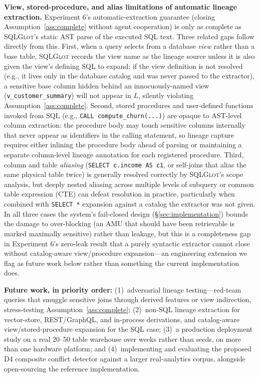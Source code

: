 \documentclass[nolineno]{ieeeaccess}
\begin{document}
\textbf{View, stored-procedure, and alias limitations of automatic lineage
extraction.} Experiment 6's automatic-extraction guarantee (closing
Assumption~\ref{ass:complete} without agent cooperation) is only as complete
as \textsc{SQLGlot}'s static AST parse of the executed SQL text. Three
related gaps follow directly from this. First, when a query selects from a
database \emph{view} rather than a base table, \textsc{SQLGlot} records the
view name as the lineage source unless it is also given the view's defining
SQL to expand; if the view definition is not resolved (e.g., it lives only
in the database catalog and was never passed to the extractor), a
sensitive base column hidden behind an innocuously-named view
(\texttt{v\_customer\_summary}) will not appear in $L$, silently violating
Assumption~\ref{ass:complete}. Second, stored procedures and
user-defined functions invoked from SQL (e.g., \texttt{CALL
compute\_churn(...)}) are opaque to AST-level column extraction: the
procedure body may touch sensitive columns internally that never appear as
identifiers in the calling statement, so lineage capture requires either
inlining the procedure body ahead of parsing or maintaining a separate
column-level lineage annotation for each registered procedure. Third,
column and table \emph{aliasing} (\texttt{SELECT c.income AS c1}, or
self-joins that alias the same physical table twice) is generally resolved
correctly by \textsc{SQLGlot}'s scope analysis, but deeply nested aliasing
across multiple levels of subquery or common table expression (CTE) can defeat resolution in
practice, particularly when combined with \texttt{SELECT~*} expansion
against a catalog the extractor was not given.
In all three cases the system's fail-closed design
(\S\ref{sec:implementation}) bounds the damage to over-blocking (an AMU
that should have been retrievable is marked maximally sensitive) rather
than leakage, but this is a completeness gap in Experiment 6's zero-leak
result that a purely syntactic extractor cannot close without
catalog-aware view/procedure expansion---an engineering extension we flag
as future work below rather than something the current implementation
does.

\textbf{Future work, in priority order:}\label{sec:futurework}
(1)~adversarial lineage testing---red-team
queries that smuggle sensitive joins through derived features or
view indirection, stress-testing Assumption~\ref{ass:complete}; (2)~non-SQL
lineage extraction for vector-store, REST/GraphQL, and in-process
derivations, and catalog-aware view/stored-procedure expansion for the SQL
case; (3)~a production deployment study on a real 20--50 table
warehouse over weeks rather than seeds, on more than one hardware platform;
and (4)~implementing and evaluating
the proposed D4 composite conflict detector against a larger real-analytics
corpus, alongside open-sourcing the reference implementation.
\end{document}
